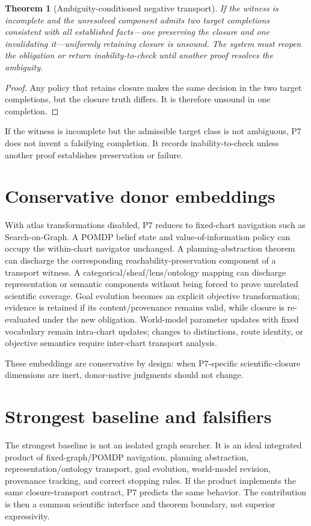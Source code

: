 \documentclass[11pt]{article}
\newtheorem{theorem}{Theorem}
\begin{document}
\begin{theorem}[Ambiguity-conditioned negative transport]
If the witness is incomplete and the unresolved component admits two target completions consistent with all established facts---one preserving the closure and one invalidating it---uniformly retaining closure is unsound. The system must reopen the obligation or return inability-to-check until another proof resolves the ambiguity.
\end{theorem}
\begin{proof}
Any policy that retains closure makes the same decision in the two target completions, but the closure truth differs. It is therefore unsound in one completion.
\end{proof}

If the witness is incomplete but the admissible target class is not ambiguous, P7 does not invent a falsifying completion. It records inability-to-check unless another proof establishes preservation or failure.

\section{Conservative donor embeddings}
With atlas transformations disabled, P7 reduces to fixed-chart navigation such as Search-on-Graph. A POMDP belief state and value-of-information policy can occupy the within-chart navigator unchanged. A planning-abstraction theorem can discharge the corresponding reachability-preservation component of a transport witness. A categorical\slash sheaf\slash lens\slash ontology mapping can discharge representation or semantic components without being forced to prove unrelated scientific coverage. Goal evolution becomes an explicit objective transformation; evidence is retained if its content/provenance remains valid, while closure is re-evaluated under the new obligation. World-model parameter updates with fixed vocabulary remain intra-chart updates; changes to distinctions, route identity, or objective semantics require inter-chart transport analysis.

These embeddings are conservative by design: when P7-specific scientific-closure dimensions are inert, donor-native judgments should not change.

\section{Strongest baseline and falsifiers}
The strongest baseline is not an isolated graph searcher. It is an ideal integrated product of fixed-graph/POMDP navigation, planning abstraction, representation\slash ontology transport, goal evolution, world-model revision, provenance tracking, and correct stopping rules. If the product implements the same closure-transport contract, P7 predicts the same behavior. The contribution is then a common scientific interface and theorem boundary, not superior expressivity.
\end{document}
